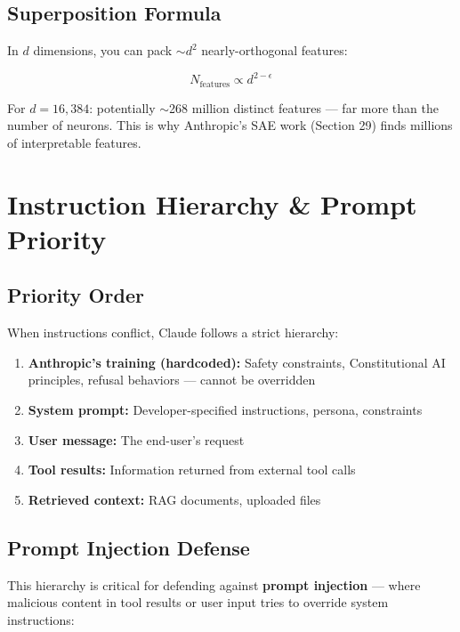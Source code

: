 \documentclass[11pt,a4paper]{article}
\begin{document}
\subsection{Superposition Formula}

In $d$ dimensions, you can pack $\sim d^2$ nearly-orthogonal features:

$$N_{\text{features}} \propto d^{2-\epsilon}$$

For $d = 16{,}384$: potentially $\sim$268 million distinct features --- far more than the number of neurons. This is why Anthropic's SAE work (Section 29) finds millions of interpretable features.

\section{Instruction Hierarchy \& Prompt Priority}

\subsection{Priority Order}

When instructions conflict, Claude follows a strict hierarchy:

\begin{tcolorbox}[colback=red!3, colframe=red!50!black, title={\bfseries Instruction Priority (Highest $\to$ Lowest)}]
\begin{enumerate}[itemsep=2pt]
  \item \textbf{Anthropic's training (hardcoded):} Safety constraints, Constitutional AI principles, refusal behaviors --- cannot be overridden
  \item \textbf{System prompt:} Developer-specified instructions, persona, constraints
  \item \textbf{User message:} The end-user's request
  \item \textbf{Tool results:} Information returned from external tool calls
  \item \textbf{Retrieved context:} RAG documents, uploaded files
\end{enumerate}
\end{tcolorbox}

\subsection{Prompt Injection Defense}

This hierarchy is critical for defending against \textbf{prompt injection} --- where malicious content in tool results or user input tries to override system instructions:
\end{document}
